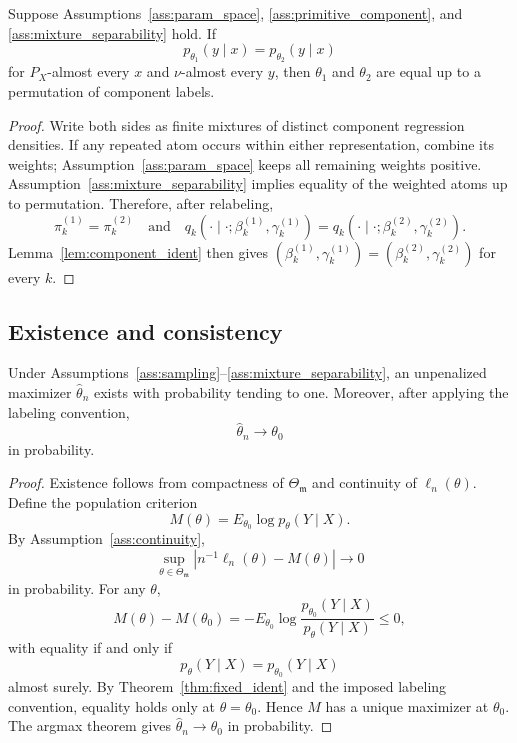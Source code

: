 \begin{theorem}
\label{thm:fixed_ident}
Suppose Assumptions~\ref{ass:param_space}, \ref{ass:primitive_component}, and
\ref{ass:mixture_separability} hold.  If
\[
    p_{\theta_1}(y\mid x)=p_{\theta_2}(y\mid x)
\]
for \(P_X\)-almost every \(x\) and \(\nu\)-almost every \(y\), then
\(\theta_1\) and \(\theta_2\) are equal up to a permutation of component
labels.
\end{theorem}

\begin{proof}
Write both sides as finite mixtures of distinct component regression densities.
If any repeated atom occurs within either representation, combine its weights;
Assumption~\ref{ass:param_space} keeps all remaining weights positive.
Assumption~\ref{ass:mixture_separability} implies equality of the weighted
atoms up to permutation.  Therefore, after relabeling,
\[
    \pi_k^{(1)}=\pi_k^{(2)}
    \quad\text{and}\quad
    q_k(\cdot\mid\cdot;\beta_k^{(1)},\gamma_k^{(1)})
    =
    q_k(\cdot\mid\cdot;\beta_k^{(2)},\gamma_k^{(2)}).
\]
Lemma~\ref{lem:component_ident} then gives
\((\beta_k^{(1)},\gamma_k^{(1)})
=
(\beta_k^{(2)},\gamma_k^{(2)})\) for every \(k\).
\end{proof}

\subsection{Existence and consistency}

\begin{theorem}
\label{thm:consistency}
Under Assumptions~\ref{ass:sampling}--\ref{ass:mixture_separability}, an
unpenalized maximizer \(\hat\theta_n\) exists with probability tending to one.
Moreover, after applying the labeling convention,
\[
    \hat\theta_n\to\theta_0
\]
in probability.
\end{theorem}

\begin{proof}
Existence follows from compactness of \(\Theta_{\mathfrak m}\) and continuity of
\(\ell_n(\theta)\).  Define the population criterion
\[
    M(\theta)=E_{\theta_0}\log p_\theta(Y\mid X).
\]
By Assumption~\ref{ass:continuity},
\[
    \sup_{\theta\in\Theta_{\mathfrak m}}
    |n^{-1}\ell_n(\theta)-M(\theta)|
    \to 0
\]
in probability.  For any \(\theta\),
\[
    M(\theta)-M(\theta_0)
    =
    -E_{\theta_0}
    \log\frac{p_{\theta_0}(Y\mid X)}{p_\theta(Y\mid X)}
    \le 0,
\]
with equality if and only if
\[
    p_\theta(Y\mid X)=p_{\theta_0}(Y\mid X)
\]
almost surely.  By Theorem~\ref{thm:fixed_ident} and the imposed labeling
convention, equality holds only at \(\theta=\theta_0\).  Hence \(M\) has a
unique maximizer at \(\theta_0\).  The argmax theorem gives
\(\hat\theta_n\to\theta_0\) in probability.
\end{proof}

